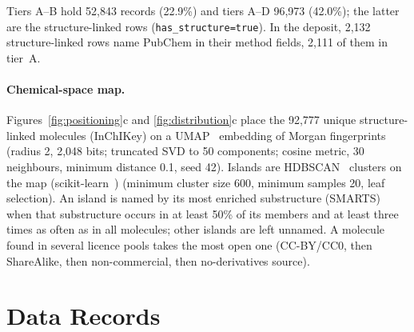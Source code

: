 \documentclass[pdflatex,sn-nature]{sn-jnl}
\begin{document}
Tiers A--B hold 52,843 records (22.9\%) and tiers A--D 96,973 (42.0\%); the latter
are the structure-linked rows (\texttt{has\_structure=true}).
In the deposit, 2,132 structure-linked rows name PubChem in their method fields, 2,111
of them in tier~A.

\paragraph{Chemical-space map.}
Figures~\ref{fig:positioning}c and \ref{fig:distribution}c place the 92,777 unique
structure-linked molecules (InChIKey) on a UMAP~\citep{mcinnes2018umap} embedding of
Morgan fingerprints~\citep{rogers2010ecfp} (radius 2,
2,048 bits; truncated SVD to 50 components; cosine metric, 30 neighbours, minimum
distance 0.1, seed 42).
Islands are HDBSCAN~\citep{campello2013hdbscan} clusters on the map
(scikit-learn~\citep{pedregosa2011sklearn}) (minimum cluster size 600, minimum samples 20,
leaf selection).
An island is named by its most enriched substructure (SMARTS) when that substructure
occurs in at least 50\% of its members and at least three times as often as in all
molecules; other islands are left unnamed.
A molecule found in several licence pools takes the most open one
(CC-BY/CC0, then ShareAlike, then non-commercial, then no-derivatives source).

\section{Data Records}\label{sec:datarecords}
\end{document}
